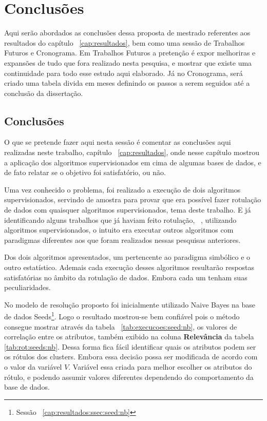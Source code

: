 \chapter*{Conclusões}\label{cap:conclusao} 
Aqui serão abordados as conclusões dessa  proposta de mestrado referentes aos resultados do capítulo ~\ref{cap:resultados},  bem como uma sessão de Trabalhos Futuros e  Cronograma. Em Trabalhos Futuros a pretenção é expor melhoriras e expansões de tudo que fora realizado  nesta pesquisa, e mostrar que existe uma continuidade para todo esse estudo aqui elaborado. Já no Cronograma, será criado uma tabela divida em meses definindo os passos a serem seguidos até a conclusão da dissertação.

\section*{Conclusões}

O que se pretende fazer aqui nesta sessão é comentar as conclusões aqui realizadas neste trabalho, capítulo ~\ref{cap:resultados}, onde nesse capítulo mostrou a aplicação dos algoritmos supervisionados em cima de algumas bases de dados, e de fato relatar se o objetivo foi satisfatório, ou não.

Uma vez conhecido o problema, foi realizado a execução de dois algoritmos supervisionados, servindo de amostra para provar que era possível fazer rotulação de dados com quaisquer algoritmos supervisionados, tema deste trabalho. E já identificando alguns trabalhos que já haviam feito rotulação, ~\cite{Lopes}, utilizando algoritmos supervisionados, o intuito era executar outros algoritmos com paradigmas diferentes aos que foram realizados nessas pesquisas anteriores. 

Dos dois algoritmos apresentados, um pertencente ao paradigma simbólico e o outro estatístico. Ademais cada execução desses algoritmos resultarão respostas satisfatórias no âmbito da rotulação de dados. Embora cada um tenham suas peculiaridades.

No modelo de resolução proposto foi inicialmente utilizado Naive Bayes na base de dados Seeds\footnote{Sessão ~\ref{cap:resultados:ssec:seed:nb}}. Logo o resultado mostrou-se bem confiável pois o método consegue mostrar através da tabela ~\ref{tab:execucoes:seed:nb}, os valores de correlação entre os atributos, também exibido na coluna \textbf{Relevância} da tabela \ref{tab:rot:seeds:nb}. Dessa forma fica fácil identificar quais os atributos podem ser os rótulos dos clusters. Embora essa decisão possa ser modificada de acordo com o valor da variável ${V}$. Variável essa criada para melhor escolher os atributos do rótulo, e podendo assumir valores diferentes dependendo do comportamento da base de dados.

